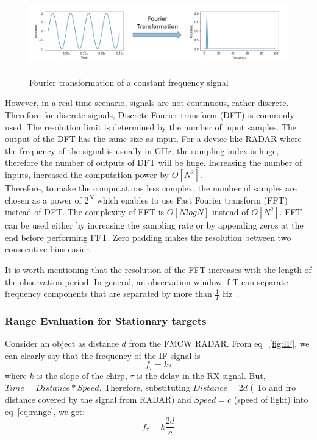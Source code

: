  \begin{figure}[ht]
  \begin{center}
    \includegraphics[width=1\textwidth, height = 3.5cm ]{Master's thesis/images/fft.png} 
    \caption{Fourier transformation of a constant frequency signal}
    \label{fig:fft}
  \end{center}
\end{figure}  

However, in a real time scenario, signals are not continuous, rather discrete. Therefore for discrete signals, Discrete Fourier transform (DFT) is commonly used. The resolution limit is determined by the number of input samples.
The output of the DFT has the same size as input. For a device like RADAR where the frequency of the signal is usually in GHz, the sampling index is huge, therefore the number of outputs of DFT will be huge. Increasing the number of inputs, increased the computation power by $O[N^2]$.
\\

Therefore, to make the computations less complex, the number of samples are chosen as a power of $2^N$ which enables to use Fast Fourier transform (FFT) instead of DFT. The complexity of FFT is $O[NlogN]$ instead of $O[N^2]$. FFT can be used either by increasing the sampling rate or by appending zeros at the end before performing FFT. Zero padding makes the resolution between two consecutive bins easier.

It is worth mentioning that the resolution of the FFT increases with the length of the observation period. In general, an observation window if T can separate frequency components that are separated by more than $\frac{1}{T}$ Hz~\cite{rao_2017}.


\subsubsection*{Range Evaluation for Stationary targets}\label{sec:rangeEval}

Consider an object as distance $d$ from the FMCW RADAR. From eq ~\eqref{fig:IF}, we can clearly say that the frequency of the IF signal is 
\begin{equation}\label{eq:range}
    f_{\tau}= k\tau
\end{equation}
where \(k\) is the slope of the chirp, $\tau$ is the delay in the RX signal.
But, \(Time = Distance*Speed\), Therefore, substituting \(Distance = 2d\) ( To and fro distance covered by the signal from RADAR) and \(Speed = c\) (speed of light) into eq~\eqref{eq:range}, we get:
\begin{equation}\label{eq:range_eq}
f_{\tau}= k\frac{2d}{c}   
\end{equation}

